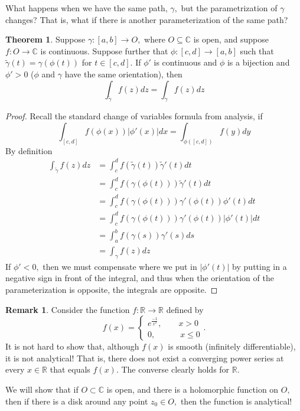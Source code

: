 \documentclass[10pt, oneside]{article}
\newcommand{\bbR}{\mathbb{R}}
\newcommand{\bbC}{\mathbb{C}}
\theoremstyle{definition}
\newtheorem{thm}{Theorem}
\newtheorem{rem}{Remark}
\newcommand{\bbC}{\mathbb{C}}
\newcommand{\bbR}{\mathbb{R}}
\begin{document}
What happens when we have the same path, $\gamma,$ but the parametrization of $\gamma$ changes? That is, what if there is another parameterization of the same path? 

\begin{thm}
    Suppose $\gamma: [a,b] \to O,$ where $O\subseteq \bbC$ is open, and suppose $f: O \to \bbC$ is continuous. Suppose further that $\phi: [c,d] \to [a,b]$ such that $\tilde{\gamma}(t) = \gamma(\phi(t))$ for $t\in [c,d].$ If $\phi'$ is continuous and $\phi$ is a bijection and $\phi' >0$ ($\phi$ and $\gamma$ have the same orientation), then 
    \[\int_{\tilde{\gamma}} f(z)dz = \int_\gamma f(z)dz\]
\end{thm}

\begin{proof}
Recall the standard change of variables formula from analysis, if
\[\int_{[c,d]} f(\phi(x))|\phi'(x)|dx = \int_{\phi([c,d])}f(y)dy\]
    By definition
    \begin{align*}
        \int_{\tilde{\gamma}} f(z)dz &= \int_c^d f(\tilde{\gamma}(t))\tilde{\gamma}'(t) dt\\
        &= \int_c^d f(\gamma(\phi(t)))\tilde{\gamma}'(t)dt\\
        &= \int_c^d f(\gamma(\phi(t)))\gamma'(\phi(t))\phi'(t)dt\\
        &= \int_c^d f(\gamma(\phi(t)))\gamma'(\phi(t))|\phi'(t)|dt\\
        &= \int_a^b f(\gamma(s))\gamma'(s)ds\\
        &= \int_\gamma f(z)dz
    \end{align*}
If $\phi' < 0,$ then we must compensate where we put in $|\phi'(t)|$ by putting in a negative sign in front of the integral, and thus when the orientation of the parameterization is opposite, the integrals are opposite.
\end{proof}


\begin{rem}
    Consider the function $f: \bbR \to \bbR$ defined by 
    \[f(x) = \begin{cases}
        e^\frac{-1}{x^2}, \qquad x >0\\
        0, \qquad \quad x\leq 0
    \end{cases}.\] It is not hard to show that, although $f(x)$ is smooth (infinitely differentiable), it is not analytical! That is, there does not exist a converging power series at every $x\in \bbR$ that equals $f(x).$ The converse clearly holds for $\bbR.$

    We will show that if $O \subset \bbC$ is open, and there is a holomorphic function on $O,$ then if there is a disk around any point $z_0 \in O,$ then the function is analytical!
\end{rem}
\end{document}
